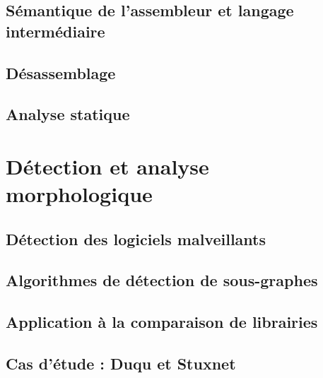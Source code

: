 \DontFrameThisInToc
\chapter{Sémantique de l'assembleur et langage intermédiaire}


\DontFrameThisInToc
\chapter{Désassemblage}


\DontFrameThisInToc
\chapter{Analyse statique}
% 

\part{Détection et analyse morphologique}

\DontFrameThisInToc
\chapter{Détection des logiciels malveillants}


\DontFrameThisInToc
\chapter{Algorithmes de détection de sous-graphes}


\DontFrameThisInToc
\chapter{Application à la comparaison de librairies}


\DontFrameThisInToc
\chapter{Cas d'étude : Duqu et Stuxnet}


\PutLineInToc

\PrintIndex

